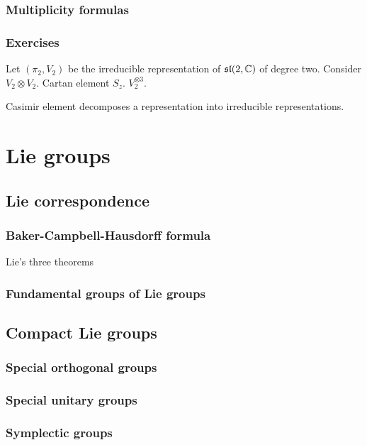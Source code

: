 \documentclass{../../large}
\begin{document}
\section{Multiplicity formulas}

\section*{Exercises}
\begin{prb}
Let $(\pi_2,V_2)$ be the irreducible representation of $\mathfrak{sl}(2,\mathbb{C})$ of degree two.
Consider $V_2\otimes V_2$.
Cartan element $S_z$.
$V_2^{\otimes3}$.
\end{prb}
\begin{prb}
Casimir element decomposes a representation into irreducible representations.
\end{prb}








\part{Lie groups}
\chapter{Lie correspondence}
\section{Baker-Campbell-Hausdorff formula}
Lie's three theorems
\section{Fundamental groups of Lie groups}

\chapter{Compact Lie groups}
\section{Special orthogonal groups}
\section{Special unitary groups}
\section{Symplectic groups}
\end{document}
